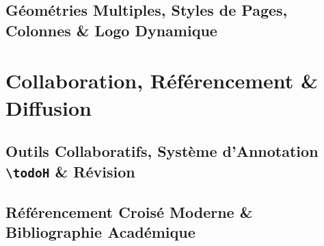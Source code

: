 \documentclass[
  english,             %
  french,              %
  font=calibri,        %
  todoNote             %
]{ClasseGuillaume}
\begin{document}
\chapter{Géométries Multiples, Styles de Pages, Colonnes \& Logo Dynamique}
\label{chap:geometries_styles}





\part{Collaboration, Référencement \& Diffusion}
\label{part:collaboration_diffusion}

\chapter{Outils Collaboratifs, Système d'Annotation \texttt{\textbackslash todoH} \& Révision}
\label{chap:collaboration_todos}



\chapter{Référencement Croisé Moderne \& Bibliographie Académique}
\label{chap:references_biblio}



\appendix





\backmatter

\listoffigures
\listofillustrations
\listoftables

\printbibliography[heading=bibintoc, title={Références Bibliographiques}]
\end{document}
